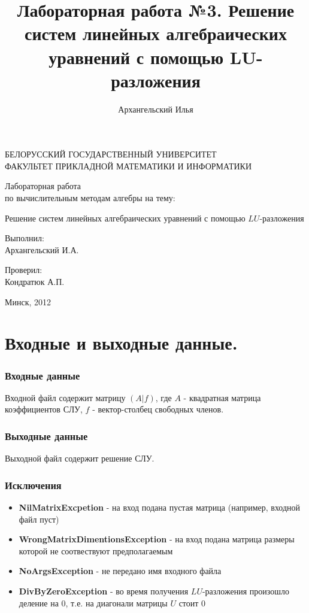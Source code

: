 \documentclass[a4paper,11pt]{article}
\title{Лабораторная работа №3. Решение систем линейных алгебраических уравнений с помощью LU-разложения}
\author{Архангельский Илья}
\begin{document}
\begin{titlepage}
	\begin{center}
		БЕЛОРУССКИЙ ГОСУДАРСТВЕННЫЙ УНИВЕРСИТЕТ \\
		ФАКУЛЬТЕТ ПРИКЛАДНОЙ МАТЕМАТИКИ И ИНФОРМАТИКИ
	\end{center}
	\vspace{10em}
	\begin{center}
		\LARGE {Лабораторная работа \\
		по вычислительным методам алгебры на тему:}
		\linebreak	 
		
    Решение систем линейных алгебраических уравнений с помощью $LU$-разложения
	\end{center}
	\vspace{3em}
	\begin{flushright}
	  
	
 	Выполнил: \\	Архангельский И.А. \\ 
 	
 	  \vspace{1em}
 	
 	  Проверил: \\ Кондратюк А.П. \\
 	
	\end{flushright}
	
	\vfill
	\begin{center}
		Минск, 2012
	\end{center}
\end{titlepage} 

\newpage
\part*{Входные и выходные данные.} 
\section*{Входные данные}
Входной файл содержит матрицу $(A|f)$, где  
  $A$ - квадратная матрица коэффициентов СЛУ, 
  $f$ - вектор-столбец свободных членов.
\section*{Выходные данные}
Выходной файл содержит  решение СЛУ. 
\section*{Исключения}
\begin{itemize}
  \item \textbf{NilMatrixExcpetion} - на вход подана пустая матрица (например, входной файл пуст)
  \item \textbf{WrongMatrixDimentionsException} - на вход подана матрица размеры которой не соотвествуют предполагаемым
  \item \textbf{NoArgsException} - не передано имя входного файла
  \item \textbf{DivByZeroException} - во время получения $LU$-разложения произошло деление на $0$, т.е. на диагонали матрицы $U$ стоит 0
\end{itemize}
\newpage
\end{document}
